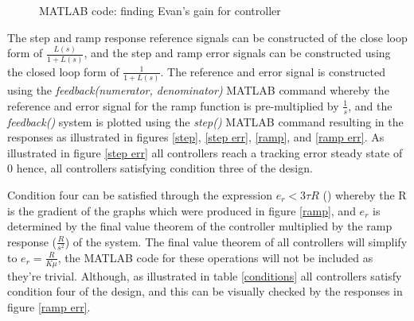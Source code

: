 \documentclass[
	12pt, %
]{fphw}
\begin{document}
\begin{figure}[htp]
    
    \caption{MATLAB code: finding Evan's gain for controller}
    \label{K}
\end{figure}
The step and ramp response reference signals can be constructed of the close loop form of $\frac{L(s)}{1 + L(s)}$, and the step and ramp error signals can be constructed using the closed loop form of $\frac{1}{1+L(s)}$. The reference and error signal is constructed using the \emph{feedback(numerator, denominator)} MATLAB command whereby the reference and error signal for the ramp function is pre-multiplied by $\frac{1}{s}$, and the \emph{feedback()} system is plotted using the \emph{step()} MATLAB command resulting in the responses as illustrated in figures \ref{step}, \ref{step err}, \ref{ramp}, and \ref{ramp err}. As illustrated in figure \ref{step err} all controllers reach a tracking error steady state of $0$ hence, all controllers satisfying condition three of the design.\par

Condition four can be satisfied through the expression $e_{r} < 3 \tau R$ (\cite{ass}) whereby the R is the gradient of the graphs which were produced in figure \ref{ramp}, and $e_{r}$ is determined by the final value theorem of the controller multiplied by the ramp response ($\frac{R}{s^{2}}$) of the system. The final value theorem of all controllers will simplify to $e_{r} = \frac{R}{K \mu}$, the MATLAB code for these operations will not be included as they're trivial. Although, as illustrated in table \ref{conditions} all controllers satisfy condition four of the design, and this can be visually checked by the responses in figure \ref{ramp err}.\par
\end{document}

